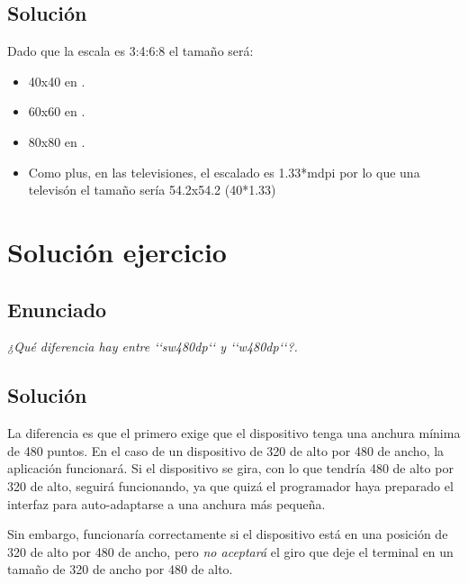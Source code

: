 \documentclass[a4paper,12pt,spanish]{sphinxmanual}
\begin{document}
\subsection{Solución}
\label{tema1:solucion}
Dado que la escala es 3:4:6:8 el tamaño será:
\begin{itemize}
\item {} 
40x40 en .

\item {} 
60x60 en .

\item {} 
80x80 en .

\item {} 
Como plus, en las televisiones, el escalado es 1.33*mdpi por lo que una televisón el tamaño sería 54.2x54.2 (40*1.33)

\end{itemize}


\section{Solución ejercicio}
\label{tema1:id6}

\subsection{Enunciado}
\label{tema1:id7}
\emph{¿Qué diferencia hay entre {}`{}`sw480dp{}`{}` y {}`{}`w480dp{}`{}`?.}


\subsection{Solución}
\label{tema1:id8}
La diferencia es que el primero exige que el dispositivo tenga una anchura mínima de 480 puntos. En el caso de un dispositivo de 320 de alto por 480 de ancho, la aplicación funcionará. Si el dispositivo se gira, con lo que tendría 480 de alto por 320 de alto, seguirá funcionando, ya que quizá el programador haya preparado el interfaz para auto-adaptarse a una anchura más pequeña.

Sin embargo,  funcionaría correctamente si el dispositivo está en una posición de 320 de alto por 480 de ancho, pero \emph{no aceptará} el giro que deje el terminal en un tamaño de 320 de ancho por 480 de alto.
\end{document}
